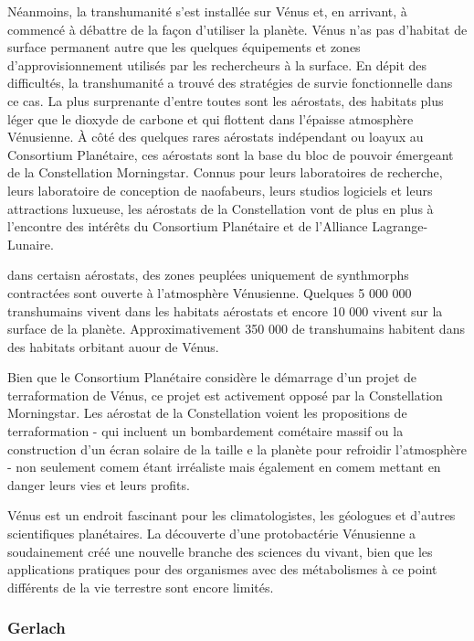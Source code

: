                                                       Néanmoins, la transhumanité s'est installée sur Vénus et, en arrivant, à commencé à débattre de la façon d'utiliser la planète. Vénus n'as pas d'habitat de surface permanent autre que les quelques équipements et zones d'approvisionnement utilisés par les rechercheurs à la surface. En dépit des difficultés, la transhumanité a trouvé des stratégies de survie fonctionnelle dans ce cas. La plus surprenante d'entre toutes sont les aérostats, des habitats plus léger que le dioxyde de carbone et qui flottent dans l'épaisse atmosphère Vénusienne. À côté des quelques rares aérostats indépendant ou loayux au  Consortium Planétaire, ces aérostats sont la base du bloc de pouvoir émergeant de la Constellation Morningstar. Connus pour leurs laboratoires de recherche, leurs laboratoire de conception de naofabeurs, leurs studios logiciels et leurs attractions luxueuse, les aérostats de la Constellation vont de plus en plus à l'encontre des intérêts du Consortium Planétaire et de l'Alliance Lagrange-Lunaire. 

                                                      dans certaisn aérostats, des zones peuplées uniquement de synthmorphs contractées sont ouverte à l'atmosphère Vénusienne. Quelques 5 000 000 transhumains vivent dans les habitats aérostats et encore 10 000 vivent sur la surface de la planète. Approximativement 350 000 de transhumains habitent dans des habitats orbitant auour de Vénus. 

                                                      Bien que le Consortium Planétaire considère le démarrage d'un projet de terraformation de Vénus, ce projet est activement opposé par la Constellation Morningstar. Les aérostat de la Constellation voient les propositions de terraformation - qui incluent un bombardement cométaire massif ou la construction d'un écran solaire de la taille e la planète pour refroidir l'atmosphère - non seulement comem étant irréaliste mais également en comem mettant en danger leurs vies et leurs profits. 

                                                      Vénus est un endroit fascinant pour les climatologistes, les géologues et d'autres scientifiques planétaires. La découverte d'une protobactérie Vénusienne a soudainement créé une nouvelle branche des sciences du vivant, bien que les applications pratiques pour des organismes avec des métabolismes à ce point différents de la vie terrestre sont encore limités. 

                                                      \subsubsection{Gerlach} \label{sec:gerlach} 

